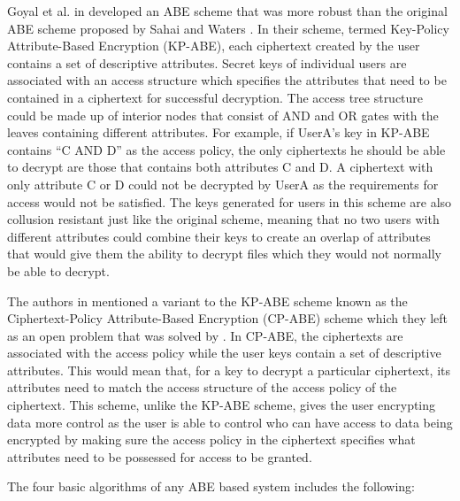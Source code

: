 Goyal et al. in \cite{Goyal2006} developed an ABE scheme that was more robust than the original ABE scheme proposed by Sahai and Waters \cite{Sahai2005}. In their scheme, termed Key-Policy Attribute-Based Encryption (KP-ABE), each ciphertext created by the user contains a set of descriptive attributes. Secret keys of individual users are associated with an access structure which specifies the attributes that need to be contained in a ciphertext for successful decryption. The access tree structure could be made up of interior nodes that consist of AND and OR gates with the leaves containing different attributes. For example, if UserA’s key in KP-ABE contains “C AND D” as the access policy, the only ciphertexts he should be able to decrypt are those that contains both attributes C and D. A ciphertext with only attribute C or D could not be decrypted by UserA as the requirements for access would not be satisfied. The keys generated for users in this scheme are also collusion resistant just like the original scheme, meaning that no two users with different attributes could combine their keys to create an overlap of attributes that would give them the ability to decrypt files which they would not normally be able to decrypt.

The authors in \cite{Goyal2006} mentioned a variant to the KP-ABE scheme known as the Ciphertext-Policy Attribute-Based Encryption (CP-ABE) scheme which they left as an open problem that was solved by \cite{Bethencourt2007}. In CP-ABE, the ciphertexts are associated with the access policy while the user keys contain a set of descriptive attributes. This would mean that, for a key to decrypt a particular ciphertext, its attributes need to match the access structure of the access policy of the ciphertext. This scheme, unlike the KP-ABE scheme, gives the user encrypting data more control as the user is able to control who can have access to data being encrypted by making sure the access policy in the ciphertext specifies what attributes need to be possessed for access to be granted.

The four basic algorithms of any ABE based system includes the following:

